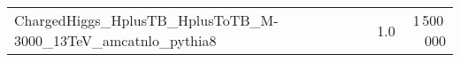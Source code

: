 \begin{center}
{\begin{tabular}{ l r r}
      ChargedHiggs\_HplusTB\_HplusToTB\_M-3000\_13TeV\_amcatnlo\_pythia8 & 1.0 & 1\,500\,000 \\

\end{tabular}}
\end{center}
